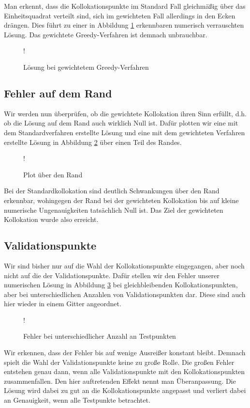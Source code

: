 Man erkennt, dass die Kollokationspunkte im Standard Fall gleichmäßig über das Einheitsquadrat verteilt sind, sich im gewichteten Fall allerdings in den Ecken drängen. Dies führt zu einer in Abbildung \ref{fig:greedy-verrauscht} erkennbaren numerisch verrauschten Lösung. Das gewichtete Greedy-Verfahren ist demnach unbrauchbar.

\begin{figure}[ht]
\centering
\resizebox {\columnwidth} {!} {

}
\caption{Lösung bei gewichtetem Greedy-Verfahren}
\label{fig:greedy-verrauscht}
\end{figure}

\subsection{Fehler auf dem Rand}

Wir werden nun überprüfen, ob die gewichtete Kollokation ihren Sinn erfüllt, d.h. ob die Lösung auf dem Rand auch wirklich Null ist. Dafür plotten wir eine mit dem Standardverfahren erstellte Lösung und eine mit dem gewichteten Verfahren erstellte Lösung in Abbildung \ref{fig:rand-vergleich} über einen Teil des Randes.

\begin{figure}[ht]
\centering
\resizebox {\columnwidth} {!} {

}
\caption{Plot über den Rand}
\label{fig:rand-vergleich}
\end{figure}

Bei der Standardkollokation sind deutlich Schwankungen über den Rand erkennbar, wohingegen der Rand bei der gewichteten Kollokation bis auf kleine numerische Ungenauigkeiten tatsächlich Null ist. Das Ziel der gewichteten Kollokation wurde also erreicht.

\subsection{Validationspunkte}

Wir sind bisher nur auf die Wahl der Kollokationspunkte eingegangen, aber noch nicht auf die der Validationspunkte. Dafür stellen wir den Fehler unserer numerischen Lösung in Abbildung \ref{fig:testpunkte} bei gleichbleibenden Kollokationspunkten, aber bei unterschiedlichen Anzahlen von Validationspunkten dar. Diese sind auch hier wieder in einem Gitter angeordnet.
\begin{figure}[H]
\centering
\resizebox {\columnwidth} {!} {

}
\caption{Fehler bei unterschiedlicher Anzahl an Testpunkten}
\label{fig:testpunkte}
\end{figure}
Wir erkennen, dass der Fehler bis auf wenige Ausreißer konstant bleibt. Demnach spielt die Wahl der Validationspunkte keine zu große Rolle. Die großen Fehler entstehen genau dann, wenn alle Validationspunkte mit den Kollokationspunkten zusammenfallen. Den hier auftretenden Effekt nennt man Überanpassung. Die Lösung wird dabei zu gut an die Kollokationspunkte angepasst und verliert dabei an Genauigkeit, wenn alle Testpunkte betrachtet.

